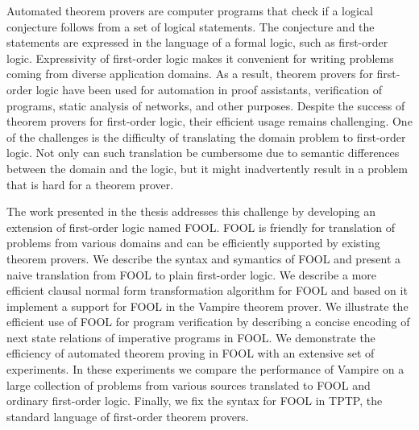Automated theorem provers are computer programs that check if a logical conjecture follows from a set of logical statements. The conjecture and the statements are expressed in the language of a formal logic, such as first-order logic. Expressivity of first-order logic makes it convenient for writing problems coming from diverse application domains. As a result, theorem provers for first-order logic have been used for automation in proof assistants, verification of programs, static analysis of networks, and other purposes. Despite the success of theorem provers for first-order logic, their efficient usage remains challenging. One of the challenges is the difficulty of translating the domain problem to first-order logic. Not only can such translation be cumbersome due to semantic differences between the domain and the logic, but it might inadvertently result in a problem that is hard for a theorem prover.

The work presented in the thesis addresses this challenge by developing an extension of first-order logic named FOOL. FOOL is friendly for translation of problems from various domains and can be efficiently supported by existing theorem provers. We describe the syntax and symantics of FOOL and present a naive translation from FOOL to plain first-order logic. We describe a more efficient clausal normal form transformation algorithm for FOOL and based on it implement a support for FOOL in the Vampire theorem prover. We illustrate the efficient use of FOOL for program verification by describing a concise encoding of next state relations of imperative programs in FOOL. We demonstrate the efficiency of automated theorem proving in FOOL with an extensive set of experiments. In these experiments we compare the performance of Vampire on a large collection of problems from various sources translated to FOOL and ordinary first-order logic. Finally, we fix the syntax for FOOL in TPTP, the standard language of first-order theorem provers.